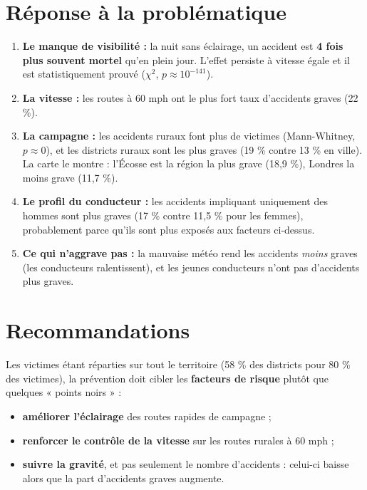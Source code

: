 \documentclass[11pt,a4paper]{report}
\begin{document}
\section{Réponse à la problématique}

\begin{keybox}
\begin{enumerate}
  \item \textbf{Le manque de visibilité :} la nuit sans éclairage, un accident est \textbf{4 fois plus souvent mortel} qu'en plein jour. L'effet persiste à vitesse égale et il est statistiquement prouvé ($\chi^2$, $p \approx 10^{-141}$).
  \item \textbf{La vitesse :} les routes à 60 mph ont le plus fort taux d'accidents graves (22 \%).
  \item \textbf{La campagne :} les accidents ruraux font plus de victimes (Mann-Whitney, $p \approx 0$), et les districts ruraux sont les plus graves (19 \% contre 13 \% en ville). La carte le montre : l'Écosse est la région la plus grave (18,9 \%), Londres la moins grave (11,7 \%).
  \item \textbf{Le profil du conducteur :} les accidents impliquant uniquement des hommes sont plus graves (17 \% contre 11,5 \% pour les femmes), probablement parce qu'ils sont plus exposés aux facteurs ci-dessus.
  \item \textbf{Ce qui n'aggrave pas :} la mauvaise météo rend les accidents \emph{moins} graves (les conducteurs ralentissent), et les jeunes conducteurs n'ont pas d'accidents plus graves.
\end{enumerate}
\end{keybox}

\section{Recommandations}

Les victimes étant réparties sur tout le territoire (58 \% des districts pour 80 \% des victimes), la prévention doit cibler les \textbf{facteurs de risque} plutôt que quelques « points noirs » :
\begin{itemize}
  \item \textbf{améliorer l'éclairage} des routes rapides de campagne ;
  \item \textbf{renforcer le contrôle de la vitesse} sur les routes rurales à 60 mph ;
  \item \textbf{suivre la gravité}, et pas seulement le nombre d'accidents : celui-ci baisse alors que la part d'accidents graves augmente.
\end{itemize}
\end{document}
